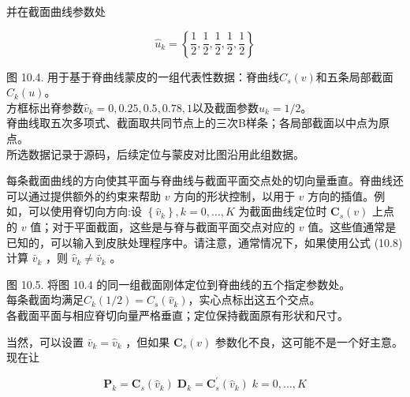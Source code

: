 \documentclass[../main.tex]{subfiles}
\begin{document}
并在截面曲线参数处

\[
{\widehat{u}}_{k} = \left\{  {\frac{1}{2},\frac{1}{2},\frac{1}{2},\frac{1}{2},\frac{1}{2}}\right\}
\]

\begin{center}
\begin{minipage}{24cm}
\vspace*{.6\baselineskip}
\centering
{}
\par\smallskip
图 10.4. 用于基于脊曲线蒙皮的一组代表性数据：脊曲线$C_s(v)$和五条局部截面$C_k(u)$。\\
方框标出脊参数$\widehat v_k=0,0.25,0.5,0.78,1$以及截面参数$\widehat u_k=1/2$。\\
脊曲线取五次多项式、截面取共同节点上的三次B样条；各局部截面以中点为原点。\\
所选数据记录于源码，后续定位与蒙皮对比图沿用此组数据。
\end{minipage}
\end{center}

每条截面曲线的方向使其平面与脊曲线与截面平面交点处的切向量垂直。脊曲线还可以通过提供额外的约束来帮助 \(v\) 方向的形状控制，以用于 \(v\) 方向的插值。例如，可以使用脊切向方向:设 \(\left\{  {\widehat{v}}_{k}\right\}  ,k = 0,\ldots ,K\) 为截面曲线定位时 \({\mathbf{C}}_{s}\left( v\right)\) 上点的 \(v\) 值；对于平面截面，这些是与脊与截面平面交点对应的 \(v\) 值。这些值通常是已知的，可以输入到皮肤处理程序中。请注意，通常情况下，如果使用公式 (10.8) 计算 \({\bar{v}}_{k}\) ，则 \({\widehat{v}}_{k} \neq  {\bar{v}}_{k}\) 。

\begin{center}
\begin{minipage}{22cm}
\vspace*{.6\baselineskip}
\centering
{}
\par\smallskip
图 10.5. 将图 10.4 的同一组截面刚体定位到脊曲线的五个指定参数处。\\
每条截面均满足$C_k(1/2)=C_s(\widehat v_k)$，实心点标出这五个交点。\\
各截面平面与相应脊切向量严格垂直；定位保持截面原有形状和尺寸。
\end{minipage}
\end{center}

当然，可以设置 \({\bar{v}}_{k} = {\widehat{v}}_{k}\) ，但如果 \({\mathbf{C}}_{s}\left( v\right)\) 参数化不良，这可能不是一个好主意。现在让

\[
{\mathbf{P}}_{k} = {\mathbf{C}}_{s}\left( {\widehat{v}}_{k}\right) \;{\mathbf{D}}_{k} = {\mathbf{C}}_{s}^{\prime }\left( {\widehat{v}}_{k}\right) \;k = 0,\ldots ,K
\]
\end{document}
